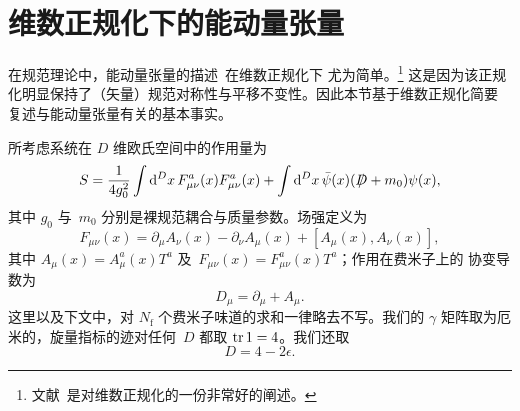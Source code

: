 \section{维数正规化下的能动量张量}
\label{sec:2}
在规范理论中，能动量张量的描述~\cite{Freedman:1974gs,Joglekar:1975jm}在维数正规化下
尤为简单。\footnote{文献~\cite{Collins:1984xc}是对维数正规化的一份非常好的阐述。}
这是因为该正规化明显保持了（矢量）规范对称性与平移不变性。因此本节基于维数正规化简要
复述与能动量张量有关的基本事实。

所考虑系统在 $D$ 维欧氏空间中的作用量为
\begin{equation}
   S=\frac{1}{4g_0^2}\int\mathrm{d}^Dx\,F_{\mu\nu}^a(x)F_{\mu\nu}^a(x)
   +\int\mathrm{d}^Dx\,\Bar{\psi}(x)(\Slash{D}+m_0)\psi(x),
\label{eq:(2.1)}
\end{equation}
其中 $g_0$ 与~$m_0$ 分别是裸规范耦合与质量参数。场强定义为
\begin{equation}
   F_{\mu\nu}(x)
   =\partial_\mu A_\nu(x)-\partial_\nu A_\mu(x)+[A_\mu(x),A_\nu(x)],
\label{eq:(2.2)}
\end{equation}
其中 $A_\mu(x)=A_\mu^a(x)T^a$ 及~$F_{\mu\nu}(x)=F_{\mu\nu}^a(x)T^a$；作用在费米子上的
协变导数为
\begin{equation}
   D_\mu=\partial_\mu+A_\mu.
\label{eq:(2.3)}
\end{equation}
这里以及下文中，对 $N_{\mathrm{f}}$ 个费米子味道的求和一律略去不写。我们的 $\gamma$
矩阵取为厄米的，旋量指标的迹对任何~$D$ 都取 $\operatorname{tr} 1=4$。我们还取
\begin{equation}
   D=4-2\epsilon.
\label{eq:(2.4)}
\end{equation}

